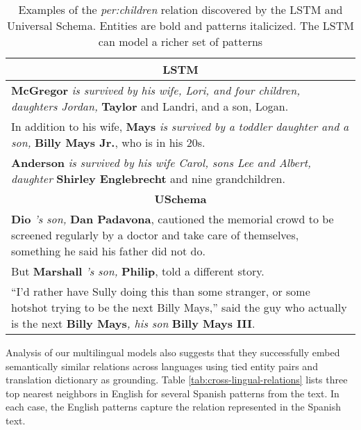\begin{table}[h]
\begin{center}
\caption{Examples of the \emph{per:children} relation discovered by the LSTM and Universal Schema. Entities are bold and patterns italicized. The LSTM can model a richer set of patterns \label{tab:lstm-us-similar-rels}}
\small
\begin{tabular}{|p{8cm}|}
\hline
\multicolumn{1}{|c|}{\textbf{LSTM}} \\ \hline
{\bf McGregor} \emph{is survived by his wife, Lori, and four children, daughters Jordan,} { \bf Taylor} and Landri, and a son, Logan. \\ \hline
In addition to his wife, {\bf Mays} \emph{is survived by a toddler daughter and a son,} {\bf Billy Mays Jr.}, who is in his 20s. \\ \hline
{\bf Anderson} \emph{is survived by his wife Carol, sons Lee and Albert, daughter} {\bf Shirley Englebrecht} and nine grandchildren. \\
\hline\hline
\multicolumn{1}{|c|}{\textbf{USchema}}  \\ \hline
{\bf Dio} \emph{'s son,} {\bf Dan Padavona}, cautioned the memorial crowd to be screened regularly by a doctor and take care of themselves, something he said his father did not do. \\ \hline
But {\bf Marshall} \emph{'s son,} {\bf Philip}, told a different story.  \\ \hline
``I'd rather have Sully doing this than some stranger, or some hotshot trying to
be the next Billy Mays,'' said the guy who actually is the next {\bf Billy Mays}\emph{, his son} {\bf Billy Mays III}. \\ 
\hline
\end{tabular}
\end{center}
\end{table}

Analysis of our multilingual models also suggests that they successfully embed semantically similar relations across languages using tied entity pairs and translation dictionary as grounding. Table \ref{tab:cross-lingual-relations} lists three top nearest neighbors in English for several Spanish patterns from the text. In each case, the English patterns capture the relation represented in the Spanish text. 

